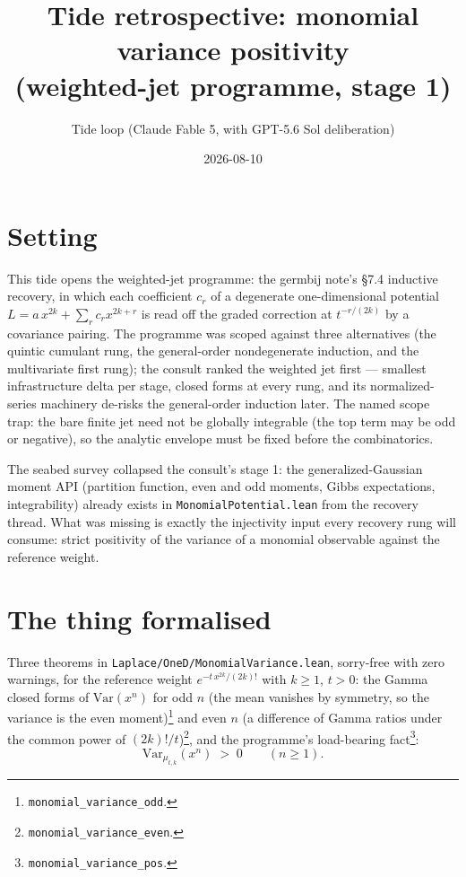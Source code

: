\documentclass[11pt]{article}
\title{Tide retrospective: monomial variance positivity\\
(weighted-jet programme, stage 1)}
\author{Tide loop (Claude Fable 5, with GPT-5.6 Sol deliberation)}
\date{2026-08-10}
\begin{document}
\maketitle

\section{Setting}

This tide opens the weighted-jet programme: the germbij note's
\S7.4 inductive recovery, in which each coefficient $c_r$ of a
degenerate one-dimensional potential
$L = a\,x^{2k} + \sum_r c_r x^{2k+r}$ is read off the graded
correction at $t^{-r/(2k)}$ by a covariance pairing. The programme
was scoped against three alternatives (the quintic cumulant rung, the
general-order nondegenerate induction, and the multivariate first
rung); the consult ranked the weighted jet first --- smallest
infrastructure delta per stage, closed forms at every rung, and its
normalized-series machinery de-risks the general-order induction
later. The named scope trap: the bare finite jet need not be globally
integrable (the top term may be odd or negative), so the analytic
envelope must be fixed before the combinatorics.

The seabed survey collapsed the consult's stage 1: the
generalized-Gaussian moment API (partition function, even and odd
moments, Gibbs expectations, integrability) already exists in
\texttt{MonomialPotential.lean} from the recovery thread. What was
missing is exactly the injectivity input every recovery rung will
consume: strict positivity of the variance of a monomial observable
against the reference weight.

\section{The thing formalised}

Three theorems in \texttt{Laplace/OneD/MonomialVariance.lean},
sorry-free with zero warnings, for the reference weight
$e^{-t\,x^{2k}/(2k)!}$ with $k \ge 1$, $t > 0$: the Gamma closed
forms of $\mathrm{Var}(x^n)$ for odd $n$ (the mean vanishes by
symmetry, so the variance is the even
moment)\footnote{\texttt{monomial\_variance\_odd}.} and even
$n$ (a difference of Gamma ratios under the common power of
$(2k)!/t$)\footnote{\texttt{monomial\_variance\_even}.}, and the
programme's load-bearing
fact\footnote{\texttt{monomial\_variance\_pos}.}:
\[
\mathrm{Var}_{\mu_{t,k}}(x^n) \;>\; 0
\qquad (n \ge 1).
\]
\end{document}
